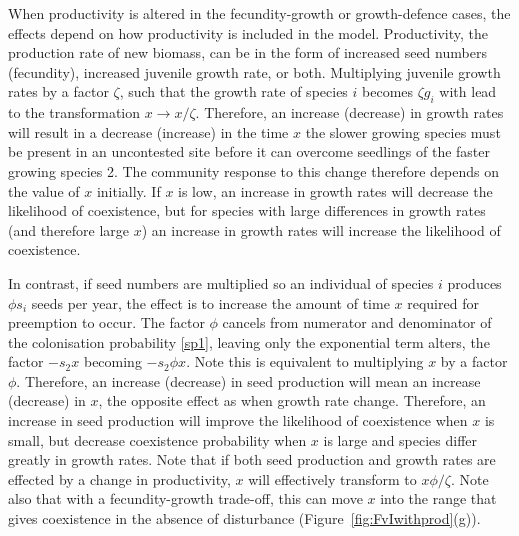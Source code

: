 \documentclass[a4paper]{article}
\begin{document}
When productivity is altered in the fecundity-growth or growth-defence cases, the effects depend on how productivity is included in the model. Productivity, the production rate of new biomass, can be in the form of increased seed numbers (fecundity), increased juvenile growth rate, or both. Multiplying juvenile growth rates by a factor $\zeta$, such that the growth rate of species $i$ becomes $\zeta g_i$ with lead to the transformation $x \to x/\zeta$. Therefore, an increase (decrease) in growth rates will result in a decrease (increase) in the time $x$ the slower growing species must be present in an uncontested site before it can overcome seedlings of the faster growing species 2. The community response to this change therefore depends on the value of $x$ initially. If $x$ is low, an increase in growth rates will decrease the likelihood of coexistence, but for species with large differences in growth rates (and therefore large $x$) an increase in growth rates will increase the likelihood of coexistence.

In contrast, if seed numbers are multiplied so an individual of species $i$ produces $\phi s_i$ seeds per year, the effect is to increase the amount of time $x$ required for preemption to occur. The factor $\phi$ cancels from numerator and denominator of the colonisation probability \eqref{sp1}, leaving only the exponential term alters, the factor $-s_2 x$ becoming $-s_2 \phi x$. Note this is equivalent to multiplying $x$ by a factor $\phi$. Therefore, an increase (decrease) in seed production will mean an increase (decrease) in $x$, the opposite effect as when growth rate change. Therefore, an increase in seed production will improve the likelihood of coexistence when $x$ is small, but decrease coexistence probability when $x$ is large and species differ greatly in growth rates. Note that if both seed production and growth rates are effected by a change in productivity, $x$ will effectively transform to $x \phi / \zeta$. Note also that with a fecundity-growth trade-off, this can move $x$ into the range that gives coexistence in the absence of disturbance (Figure~\ref{fig:FvIwithprod}(g)).
\end{document}
